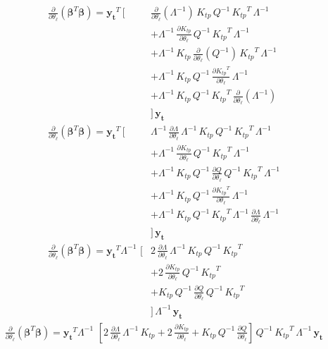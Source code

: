 \documentclass[11pt,a4paper]{article}
\numberwithin{equation}{section}
\begin{document}
\begin{align}
\frac{\partial }{\partial \theta_\ell}\left({\bm \beta}^T{\bm \beta}\right) = \mathbf{y_t}^T\,[
   &\frac{\partial }{\partial \theta_\ell}\left(\Lambda^{-1}\right)\,K_{tp}\,Q^{-1}\,{K_{tp}}^T\,\Lambda^{-1}\\
   &+\Lambda^{-1}\,\frac{\partial K_{tp}}{\partial \theta_\ell}\,Q^{-1}\,{K_{tp}}^T\,\Lambda^{-1} \\
   &+\Lambda^{-1}\,K_{tp}\,\frac{\partial }{\partial \theta_\ell}\left(Q^{-1}\right)\,{K_{tp}}^T\,\Lambda^{-1} \\
   &+\Lambda^{-1}\,K_{tp}\,Q^{-1}\,\frac{\partial {K_{tp}}^T}{\partial \theta_\ell}\,\Lambda^{-1} \\
   &+\Lambda^{-1}\,K_{tp}\,Q^{-1}\,{K_{tp}}^T\,\frac{\partial }{\partial \theta_\ell}\left(\Lambda^{-1}\right) \\
   &]\,\mathbf{y_t} \\
\frac{\partial }{\partial \theta_\ell}\left({\bm \beta}^T{\bm \beta}\right) = \mathbf{y_t}^T\,[
   &\Lambda^{-1}\,\frac{\partial \Lambda}{\partial \theta_\ell}\,\Lambda^{-1}\,K_{tp}\,Q^{-1}\,{K_{tp}}^T\,\Lambda^{-1}\\
   &+\Lambda^{-1}\,\frac{\partial K_{tp}}{\partial \theta_\ell}\,Q^{-1}\,{K_{tp}}^T\,\Lambda^{-1} \\
   &+\Lambda^{-1}\,K_{tp}\,Q^{-1}\,\frac{\partial Q}{\partial \theta_\ell}\,Q^{-1}\,{K_{tp}}^T\,\Lambda^{-1} \\
   &+\Lambda^{-1}\,K_{tp}\,Q^{-1}\,\frac{\partial {K_{tp}}^T}{\partial \theta_\ell}\,\Lambda^{-1} \\
   &+\Lambda^{-1}\,K_{tp}\,Q^{-1}\,{K_{tp}}^T\,\Lambda^{-1}\,\frac{\partial \Lambda}{\partial \theta_\ell}\,\Lambda^{-1} \\
   &]\,\mathbf{y_t} \\
\frac{\partial }{\partial \theta_\ell}\left({\bm \beta}^T{\bm \beta}\right) = \mathbf{y_t}^T\Lambda^{-1}\,\,[
   &2\,\frac{\partial \Lambda}{\partial \theta_\ell}\,\Lambda^{-1}\,K_{tp}\,Q^{-1}\,{K_{tp}}^T\\
   &+2\,\frac{\partial K_{tp}}{\partial \theta_\ell}\,Q^{-1}\,{K_{tp}}^T \\
   &+K_{tp}\,Q^{-1}\,\frac{\partial Q}{\partial \theta_\ell}\,Q^{-1}\,{K_{tp}}^T \\
   &]\,\Lambda^{-1}\,\mathbf{y_t}
\end{align}
\begin{align}
\frac{\partial }{\partial \theta_\ell}\left({\bm \beta}^T{\bm \beta}\right) = \mathbf{y_t}^T\Lambda^{-1}\,\,\left[2\,\frac{\partial \Lambda}{\partial \theta_\ell}\,\Lambda^{-1}\,K_{tp}
   +2\,\frac{\partial K_{tp}}{\partial \theta_\ell}
   +K_{tp}\,Q^{-1}\,\frac{\partial Q}{\partial \theta_\ell}
   \right]\,Q^{-1}\,{K_{tp}}^T\,\Lambda^{-1}\,\mathbf{y_t} \label{EQ:app_dbeta}
\end{align}
\end{document}
